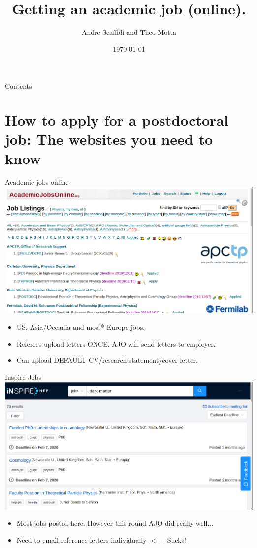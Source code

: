 \documentclass[10pt]{beamer}
\title{Getting an academic job (online).  }
\date{\today}
\author{Andre Scaffidi and Theo Motta }
\begin{document}
\maketitle

\begin{frame}{Contents}
\tableofcontents
\end{frame}


\section{How to apply for a postdoctoral job: The websites you need to know}

\begin{frame}{Academic jobs online}
\includegraphics[width=\textwidth]{ajo}
\begin{itemize}
	\item US, Asia/Oceania and most* Europe jobs. 
	\item Referees upload letters ONCE. AJO will send letters to employer. 
	\item Can upload DEFAULT CV/research statement/cover letter. 
\end{itemize}
\end{frame}
\begin{frame}{Inspire Jobs}
\includegraphics[width=\textwidth]{inspire_job}
\begin{itemize}
	\item Most jobs posted here. However this round AJO did really well...
	\item Need to email reference letters individually $<$--- Sucks!
\end{itemize}
\end{frame}
\end{document}
